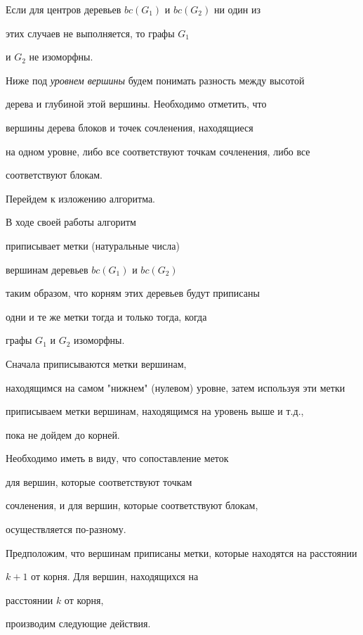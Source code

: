 Если для центров деревьев $bc(G_1)$ и $bc(G_2)$ ни один из


этих случаев не выполняется, то графы $G_1$


и $G_2$ не изоморфны.





Ниже под {\it уровнем вершины} будем понимать разность между высотой


дерева и глубиной этой вершины. Необходимо отметить, что


вершины дерева блоков и точек сочленения, находящиеся


на одном уровне, либо все соответствуют точкам сочленения, либо все


соответствуют блокам.





Перейдем к изложению алгоритма.


В ходе своей работы алгоритм


приписывает метки (натуральные числа)


вершинам деревьев $bc(G_1)$ и $bc(G_2)$


таким образом, что корням этих деревьев будут приписаны


одни и те же метки тогда и только тогда, когда


графы $G_1$ и $G_2$ изоморфны.


Сначала приписываются метки вершинам,


находящимся на самом "нижнем" (нулевом) уровне, затем используя эти метки


приписываем метки вершинам, находящимся на уровень выше и т.д.,


пока не дойдем до корней.


Необходимо иметь в виду, что сопоставление меток


для вершин, которые соответствуют точкам


сочленения, и для вершин, которые соответствуют блокам,


осуществляется по-разному.





Предположим, что вершинам приписаны метки, которые находятся на расстоянии


$k+1$ от корня. Для вершин, находящихся на


расстоянии $k$ от корня,


производим следующие действия.


